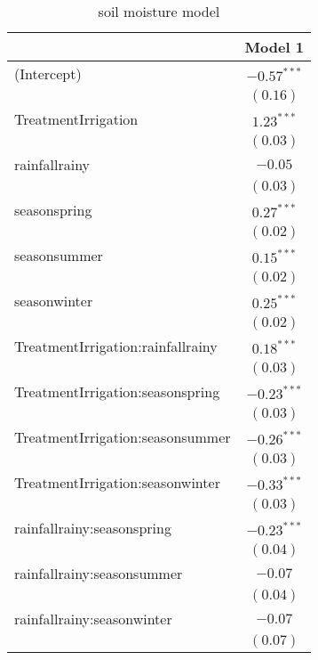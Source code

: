 
\begin{table}[!h]
\caption{soil moisture model}
\begin{center}
\begin{tabular}{l c }
\hline
 & Model 1 \\
\hline
(Intercept)                       & $-0.57^{***}$ \\
                                  & $(0.16)$      \\
TreatmentIrrigation               & $1.23^{***}$  \\
                                  & $(0.03)$      \\
rainfallrainy                     & $-0.05$       \\
                                  & $(0.03)$      \\
seasonspring                      & $0.27^{***}$  \\
                                  & $(0.02)$      \\
seasonsummer                      & $0.15^{***}$  \\
                                  & $(0.02)$      \\
seasonwinter                      & $0.25^{***}$  \\
                                  & $(0.02)$      \\
TreatmentIrrigation:rainfallrainy & $0.18^{***}$  \\
                                  & $(0.03)$      \\
TreatmentIrrigation:seasonspring  & $-0.23^{***}$ \\
                                  & $(0.03)$      \\
TreatmentIrrigation:seasonsummer  & $-0.26^{***}$ \\
                                  & $(0.03)$      \\
TreatmentIrrigation:seasonwinter  & $-0.33^{***}$ \\
                                  & $(0.03)$      \\
rainfallrainy:seasonspring        & $-0.23^{***}$ \\
                                  & $(0.04)$      \\
rainfallrainy:seasonsummer        & $-0.07$       \\
                                  & $(0.04)$      \\
rainfallrainy:seasonwinter        & $-0.07$       \\
                                  & $(0.07)$      \\

\end{tabular}
\end{center}
\end{table}
